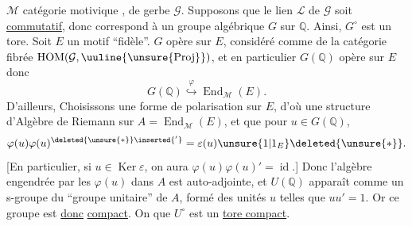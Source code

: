 
$\mathcal M$ catégorie motivique ,
de gerbe $\mathcal G$. Supposons que le lien $\mathcal L$ de $\mathcal G$
soit \uline{commutatif}, donc correspond à un groupe algébrique
 $G$ sur $\mathbb Q$.
Ainsi, $G^\circ$ est un tore. Soit $E$ un motif ``fidèle''.
 $G$ opère sur $E$, considéré comme
de la catégorie fibrée $\operatorname{HOM}(\mathcal G,\uuline{\unsure{\mathrm{Proj}}})$,
et en particulier $G(\mathbb Q)$ opère sur $E$ donc
\[
G(\mathbb Q)\overset{\varphi}{\hookrightarrow}\operatorname{End}_{\mathcal M}(E).
\]
D'ailleurs,
Choisissons une forme de polarisation sur $E$, d'où une structure
d'Algèbre de Riemann sur $A=\operatorname{End}_{\mathcal M}(E)$,
et  que pour $u\in G(\mathbb Q)$,
\[
\varphi(u)\varphi(u)^{\deleted{\unsure{*}}\inserted{'}}=
\varepsilon(u)\unsure{1|1_E}\deleted{\unsure{*}}.
\]
[En particulier, si $u\in\operatorname{Ker}\varepsilon$,
on aura $\varphi(u)\varphi(u)'=\operatorname{id}$.]
Donc l'algèbre engendrée par les $\varphi(u)$ dans $A$ est auto-adjointe,
et $U(\mathbb Q)$ apparaît comme un s-groupe du
``groupe unitaire'' de $A$, formé des unités $u$ telles que $uu'=1$.
Or ce  groupe est
 \uline{donc} \uline{compact}.
On  que $U^\circ$ est un \uline{tore compact}.

